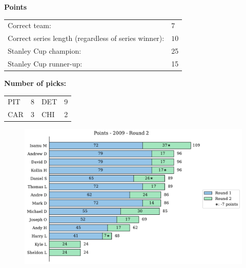 \documentclass[10pt]{article}
\begin{document}
{\bf Points}\\
\begin{minipage}{12cm}
    \begin{tabular}{l l}
        Correct team:	& $7$\\
        Correct series length (regardless of series winner):	& $10$\\
        Stanley Cup champion:	& 25\\
        Stanley Cup runner-up:	& 15\\
    \end{tabular}

    \vspace{0.5cm}
    {\bf Number of picks:}\\
    \begin{tabular}{lc | lc }
        PIT & 8 & DET & 9 \\
        CAR & 3 & CHI & 2 \\
    \end{tabular}
\end{minipage}
\begin{minipage}[t]{13cm}
    \begin{figure}[H]
        \vspace{-3.5cm}
        \includegraphics[width=12cm]{../../figures/2009/Points-2009-Round2.pdf}
    \end{figure}
\end{minipage}
\end{document}
